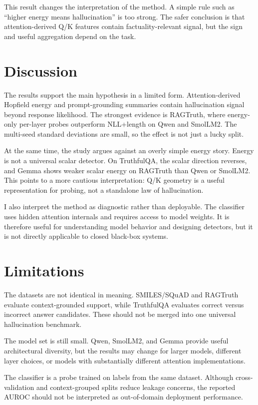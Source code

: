 \documentclass{article}
\begin{document}
This result changes the interpretation of the method. A simple rule such as ``higher energy means
hallucination'' is too strong. The safer conclusion is that attention-derived Q/K features contain
factuality-relevant signal, but the sign and useful aggregation depend on the task.

\section{Discussion}

The results support the main hypothesis in a limited form. Attention-derived Hopfield energy and
prompt-grounding summaries contain hallucination signal beyond response likelihood. The strongest
evidence is RAGTruth, where energy-only per-layer probes outperform NLL+length on Qwen and
SmolLM2. The multi-seed standard deviations are small, so the effect is not just a lucky split.

At the same time, the study argues against an overly simple energy story. Energy is not a universal
scalar detector. On TruthfulQA, the scalar direction reverses, and Gemma shows weaker scalar
energy on RAGTruth than Qwen or SmolLM2. This points to a more cautious interpretation: Q/K
geometry is a useful representation for probing, not a standalone law of hallucination.

I also interpret the method as diagnostic rather than deployable. The classifier uses hidden
attention internals and requires access to model weights. It is therefore useful for understanding
model behavior and designing detectors, but it is not directly applicable to closed black-box
systems.

\section{Limitations}

The datasets are not identical in meaning. SMILES/SQuAD and RAGTruth evaluate context-grounded
support, while TruthfulQA evaluates correct versus incorrect answer candidates. These should not be
merged into one universal hallucination benchmark.

The model set is still small. Qwen, SmolLM2, and Gemma provide useful architectural diversity, but
the results may change for larger models, different layer choices, or models with substantially
different attention implementations.

The classifier is a probe trained on labels from the same dataset. Although cross-validation and
context-grouped splits reduce leakage concerns, the reported AUROC should not be interpreted as
out-of-domain deployment performance.
\end{document}

